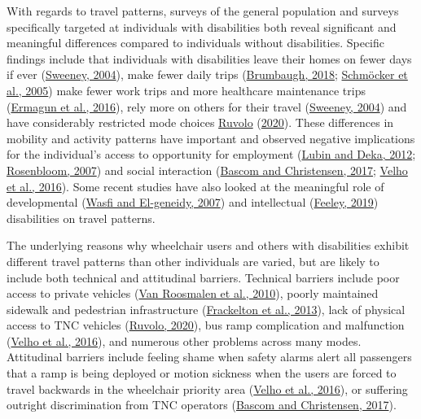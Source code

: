 \documentclass[3p, authoryear, review]{elsarticle} %
\begin{document}
With regards to travel patterns, surveys of the general population and surveys
specifically targeted at individuals with disabilities both reveal significant and
meaningful differences compared to individuals without disabilities. Specific
findings include that individuals with disabilities leave their homes on fewer
days if ever (\protect\hyperlink{ref-Sweeney2004}{Sweeney, 2004}), make fewer daily trips (\protect\hyperlink{ref-Brumbaugh2018}{Brumbaugh, 2018}; \protect\hyperlink{ref-Schmocker2005}{Schmöcker et al., 2005}) make fewer work trips and more healthcare maintenance trips
(\protect\hyperlink{ref-Ermagun2016}{Ermagun et al., 2016}), rely more on others for their travel (\protect\hyperlink{ref-Sweeney2004}{Sweeney, 2004})
and have considerably restricted mode choices \protect\hyperlink{ref-Ruvolo2020}{Ruvolo} (\protect\hyperlink{ref-Ruvolo2020}{2020}).
These differences in mobility and activity patterns have important and observed
negative implications for the individual's access to opportunity for employment
(\protect\hyperlink{ref-Lubin2012}{Lubin and Deka, 2012}; \protect\hyperlink{ref-Rosenbloom2007}{Rosenbloom, 2007}) and social interaction (\protect\hyperlink{ref-Bascom2017}{Bascom and Christensen, 2017}; \protect\hyperlink{ref-Velho2016}{Velho et al., 2016}).
Some recent studies have also looked at the meaningful role of developmental (\protect\hyperlink{ref-Wasfi2007}{Wasfi and El-geneidy, 2007})
and intellectual (\protect\hyperlink{ref-Feeley2019}{Feeley, 2019}) disabilities on travel patterns.

The underlying reasons why wheelchair users and others with disabilities exhibit
different travel patterns than other individuals are varied, but are
likely to include both technical and attitudinal barriers. Technical barriers
include poor access to private vehicles
(\protect\hyperlink{ref-VanRoosmalen2010}{Van Roosmalen et al., 2010}), poorly maintained sidewalk and pedestrian infrastructure
(\protect\hyperlink{ref-frackelton2013measuring}{Frackelton et al., 2013}), lack of physical access to TNC
vehicles (\protect\hyperlink{ref-Ruvolo2020}{Ruvolo, 2020}), bus ramp complication and malfunction (\protect\hyperlink{ref-Velho2016}{Velho et al., 2016}),
and numerous other problems across many modes.
Attitudinal barriers include feeling shame when safety alarms alert all
passengers that a ramp is being deployed or motion sickness when the users
are forced to travel backwards in the wheelchair priority area (\protect\hyperlink{ref-Velho2016}{Velho et al., 2016}), or
suffering outright discrimination from TNC operators (\protect\hyperlink{ref-Bascom2017}{Bascom and Christensen, 2017}).
\end{document}
